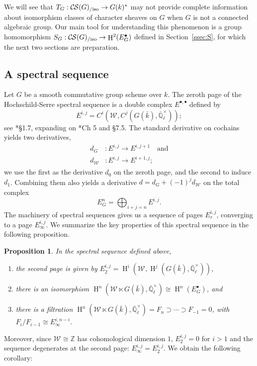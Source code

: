 \documentclass[10pt]{amsart}
\theoremstyle{plain}
\newtheorem{proposition}[theorem]{Proposition}
\theoremstyle{definition}
\newcommand{\ZZ}{{\mathbb{Z}}}
\newcommand{\EE}{\mathbb{\bar Q}_\ell}
\newcommand{\bFq}{\bar{k}}
\newcommand{\Fq}{k}
\newcommand{\EEx}{\EE^\times}
\newcommand{\Weil}[1]{\mathcal{W}_{#1}}
\DeclareMathOperator{\Hh}{H}
\newcommand{\TrFrob}[1]{T_{#1}}
\newcommand{\CS}{{\mathcal{C\hskip-0.8pt S}}}
\newcommand{\CSiso}[1]{\CS(#1)_{/\text{iso}}}
\begin{document}
We will see that $\TrFrob{G} : \CSiso{G} \to G(\Fq)^*$ may not provide complete
information about isomorphism classes of character sheaves on $G$ when $G$ is not a connected algebraic group.
Our main tool for understanding this phenomenon
is a group homomorphism $S_G: \CSiso{G} \to \Hh^2(E^\bullet_G)$ defined in Section~\ref{ssec:S}, for which the next two sections are preparation.

\subsection{A spectral sequence}\label{ssec:E}

Let $G$ be a smooth commutative group scheme over $\Fq$.
The zeroth page of the Hochschild-Serre spectral sequence
is a double complex $E^{\bullet, \bullet}$ defined by
\[
E^{i,j} = C^i(\Weil{}, C^j(G(\bFq), \EEx));
\]
see \cite{vakil:Algebraic_Geometry}*{\S 1.7}, expanding on \cite{weibel:Homological_Algebra}*{Ch 5 and \S 7.5}.
The standard derivative on cochains yields two derivatives,
\begin{align*}
d_G &: E^{i,j} \to E^{i,j+1} \quad \mbox{and} \\
d_{\Weil{}} &: E^{i,j} \to E^{i+1,j};
\end{align*}
we use the first as the derivative $d_0$ on the zeroth page, and the second to induce $d_1$.
Combining them also yields a derivative $d = d_G + (-1)^j d_{\Weil{}}$ on the total complex
\[
E^n_G = \bigoplus_{i+j=n} E^{i,j}.
\]
The machinery of spectral sequences gives us a sequence of pages $E_r^{i,j}$, converging to a page $E_{\infty}^{i,j}$. We summarize the key properties of this spectral sequence in the following proposition.

\begin{proposition} In the spectral sequence defined above,
\begin{enumerate}
\item the second page is given by $E_2^{i,j} = \Hh^i(\Weil{}, \Hh^j(G(\bFq), \EEx))$,
\item there is an isomorphism $\Hh^n(\Weil{} \ltimes G(\bFq), \EEx) \cong \Hh^n(E_G^\bullet)$, and
\item there is a filtration $\Hh^n(\Weil{} \ltimes G(\bFq), \EEx) = F_n \supset \cdots \supset F_{-1} = 0$, with $F_i / F_{i-1} \cong E_{\infty}^{i, n-i}$.
\end{enumerate}
\end{proposition}

Moreover, since $\Weil{} \cong \ZZ$ has cohomological dimension $1$, $E_2^{i,j} = 0$ for $i > 1$ and the sequence degenerates at the second page: $E_{\infty}^{i,j} = E_2^{i,j}$. We obtain the following corollary:
\end{document}

